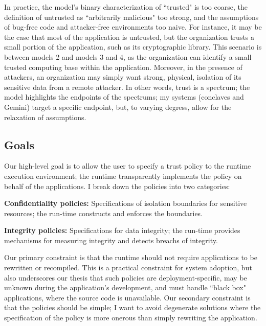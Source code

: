 In practice, the model's binary characterization of ``trusted" is too coarse,
the definition of untrusted as ``arbitrarily malicious" too strong,
and the assumptions of bug-free code and attacker-free environments too
naive.
%
For instance, it may be the case that most of the application is untrusted, but
the organization trusts a small portion of the application, such as its
cryptographic library.
%
This scenario is between models 2 and models 3 and 4, as the organization can
identify a small trusted computing base within the application.
%
Moreover, in the presence of attackers, an organization may simply
want strong, physical, isolation of its sensitive data from a remote attacker.
%
In other words, trust is a spectrum; the model highlights the endpoints of the
spectrums; my systems (conclaves and Gemini) target a specific endpoint, but,
to varying degress, allow for the relaxation of assumptions.



\subsection{Goals}

Our high-level goal is to allow the user to specify a trust policy to the
runtime execution environment; the runtime transparently implements the
policy on behalf of the applications.
%
I break down the policies into two categories:

\begin{widelist}
\item \textbf{Confidentiality policies:} Specifications of isolation boundaries for
    sensitive resources; the run-time constructs and enforces the boundaries.

\item \textbf{Integrity policies:} Specifications for data integrity; the run-time
    provides mechanisms for measuring integrity and detects breachs of
    integrity.
\end{widelist}


Our primary constraint is that the runtime should not require applications to be
rewritten or recompiled.
%
This is a practical constraint for system adoption, but also underscores our
thesis that such policies are deployment-specific, may be unknown during the
application's development, and must handle ``black box" applications, where the
source code is unavailable.
%
Our secondary constraint is that the policies should be simple; I want to avoid
degenerate solutions where the specification of the policy is more
onerous than simply rewriting the application.

